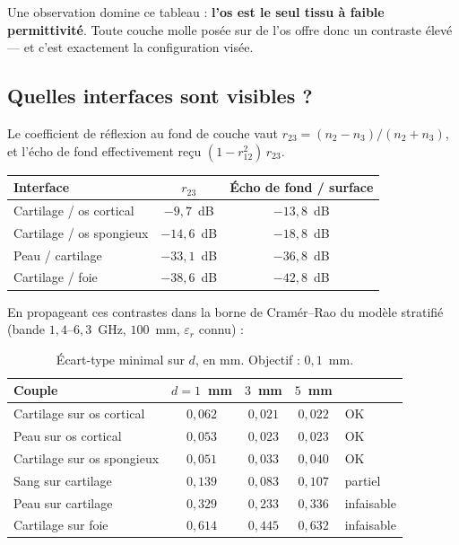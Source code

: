 \documentclass[11pt,a4paper]{article}
\newcommand{\eps}{\varepsilon_r}
\begin{document}
Une observation domine ce tableau : \textbf{l'os est le seul tissu à faible
permittivité}. Toute couche molle posée sur de l'os offre donc un contraste
élevé --- et c'est exactement la configuration visée.

\subsection{Quelles interfaces sont visibles ?}

Le coefficient de réflexion au fond de couche vaut
$r_{23} = (n_2-n_3)/(n_2+n_3)$, et l'écho de fond effectivement reçu
$(1-r_{12}^2)\,r_{23}$.

\begin{table}[h]
\centering
\begin{tabular}{lcc}
\toprule
Interface & $r_{23}$ & Écho de fond / surface \\
\midrule
Cartilage / os cortical  & $-9{,}7$~dB  & $-13{,}8$~dB \\
Cartilage / os spongieux & $-14{,}6$~dB & $-18{,}8$~dB \\
Peau / cartilage         & $-33{,}1$~dB & $-36{,}8$~dB \\
Cartilage / foie         & $-38{,}6$~dB & $-42{,}8$~dB \\
\bottomrule
\end{tabular}
\end{table}

En propageant ces contrastes dans la borne de Cramér--Rao du modèle stratifié
(bande $1{,}4$--$6{,}3$~GHz, $100$~mm, $\eps$ connu) :

\begin{table}[h]
\centering
\caption{Écart-type minimal sur $d$, en mm. Objectif : $0{,}1$~mm.}
\begin{tabular}{lcccl}
\toprule
Couple & $d = 1$~mm & $3$~mm & $5$~mm & \\
\midrule
Cartilage sur os cortical  & $0{,}062$ & $0{,}021$ & $0{,}022$ & OK \\
Peau sur os cortical       & $0{,}053$ & $0{,}023$ & $0{,}023$ & OK \\
Cartilage sur os spongieux & $0{,}051$ & $0{,}033$ & $0{,}040$ & OK \\
Sang sur cartilage         & $0{,}139$ & $0{,}083$ & $0{,}107$ & partiel \\
Peau sur cartilage         & $0{,}329$ & $0{,}233$ & $0{,}336$ & infaisable \\
Cartilage sur foie         & $0{,}614$ & $0{,}445$ & $0{,}632$ & infaisable \\
\bottomrule
\end{tabular}
\end{table}
\end{document}
